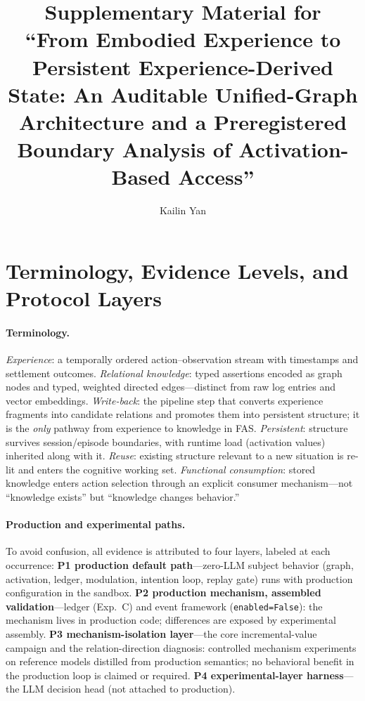 \documentclass[fleqn,10pt]{wlpeerj}
\title{Supplementary Material for\\
``From Embodied Experience to Persistent Experience-Derived State: An Auditable Unified-Graph Architecture and a Preregistered Boundary Analysis of Activation-Based Access''}
\author[1]{Kailin Yan}
\affil[1]{Department of Computer Science, China University of Petroleum-Beijing at Karamay, Karamay, China}
\begin{document}
\long\gdef\theabstract{}
\maketitle
\thispagestyle{empty}

\section{Terminology, Evidence Levels, and Protocol Layers}
\label{s1:term}

\paragraph{Terminology.} \emph{Experience}: a temporally ordered action--observation stream with timestamps and settlement outcomes. \emph{Relational knowledge}: typed assertions encoded as graph nodes and typed, weighted directed edges---distinct from raw log entries and vector embeddings. \emph{Write-back}: the pipeline step that converts experience fragments into candidate relations and promotes them into persistent structure; it is the \emph{only} pathway from experience to knowledge in FAS. \emph{Persistent}: structure survives session/episode boundaries, with runtime load (activation values) inherited along with it. \emph{Reuse}: existing structure relevant to a new situation is re-lit and enters the cognitive working set. \emph{Functional consumption}: stored knowledge enters action selection through an explicit consumer mechanism---not ``knowledge exists'' but ``knowledge changes behavior.''

\paragraph{Production and experimental paths.} To avoid confusion, all evidence is attributed to four layers, labeled at each occurrence: \textbf{P1 production default path}---zero-LLM subject behavior (graph, activation, ledger, modulation, intention loop, replay gate) runs with production configuration in the sandbox. \textbf{P2 production mechanism, assembled validation}---ledger (Exp.~C) and event framework (\texttt{enabled=False}): the mechanism lives in production code; differences are exposed by experimental assembly. \textbf{P3 mechanism-isolation layer}---the core incremental-value campaign and the relation-direction diagnosis: controlled mechanism experiments on reference models distilled from production semantics; no behavioral benefit in the production loop is claimed or required. \textbf{P4 experimental-layer harness}---the LLM decision head (not attached to production).
\end{document}

